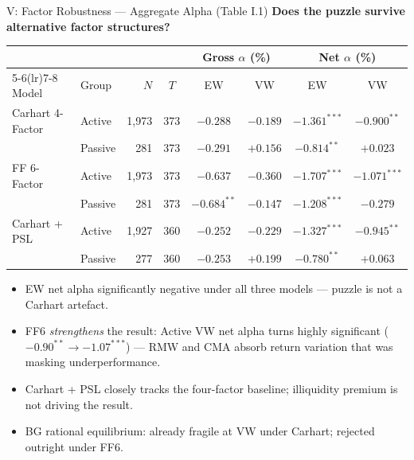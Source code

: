 \documentclass[10pt, aspectratio=169]{beamer}
\begin{document}
\begin{frame}{V: Factor Robustness — Aggregate Alpha (Table I.1)}
  \textbf{Does the puzzle survive alternative factor structures?}
  \vspace{3pt}\\
  \scriptsize
  \begin{tabular}{llrccccc}
    \toprule
    & & & & \multicolumn{2}{c}{Gross $\alpha$ (\%)} & \multicolumn{2}{c}{Net $\alpha$ (\%)} \\
    \cmidrule(lr){5-6}\cmidrule(lr){7-8}
    Model & Group & $N$ & $T$ & EW & VW & EW & VW \\
    \midrule
    Carhart 4-Factor & Active  & 1,973 & 373 & $-0.288$ & $-0.189$ & $-1.361^{***}$ & $-0.900^{**}$ \\
                     & Passive & 281   & 373 & $-0.291$ & $+0.156$ & $-0.814^{**}$  & $+0.023$ \\[2pt]
    FF 6-Factor      & Active  & 1,973 & 373 & $-0.637$ & $-0.360$ & $-1.707^{***}$ & $-1.071^{***}$ \\
                     & Passive & 281   & 373 & $-0.684^{**}$ & $-0.147$ & $-1.208^{***}$ & $-0.279$ \\[2pt]
    Carhart + PSL    & Active  & 1,927 & 360 & $-0.252$ & $-0.229$ & $-1.327^{***}$ & $-0.945^{**}$ \\
                     & Passive & 277   & 360 & $-0.253$ & $+0.199$ & $-0.780^{**}$  & $+0.063$ \\
    \bottomrule
  \end{tabular}
  \vspace{4pt}
  \normalsize
  \begin{itemize}\itemsep1pt
    \item \small EW net alpha significantly negative under all three models —
          puzzle is \alert{not a Carhart artefact}.
    \item \small FF6 \emph{strengthens} the result: Active VW net alpha
          turns highly significant ($-0.90^{**} \to -1.07^{***}$) — RMW and CMA
          absorb return variation that was masking underperformance.
    \item \small Carhart + PSL closely tracks the four-factor baseline;
          illiquidity premium is not driving the result.
    \item \small BG rational equilibrium: already fragile at VW under Carhart;
          rejected outright under FF6.
  \end{itemize}
\end{frame}
\end{document}

